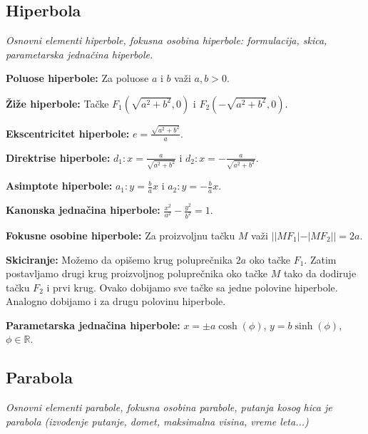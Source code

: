 \documentclass[12pt]{article}
\begin{document}
\subsection{Hiperbola}
\textit{Osnovni elementi hiperbole, fokusna osobina hiperbole: formulacija,
    skica, parametarska jednačina hiperbole.}
\par
\vspace*{1cm}

\textbf{Poluose hiperbole:} Za poluose $a$ i $b$ važi $a,b>0$.
\par

\textbf{Žiže hiperbole:} Tačke $F_1(\sqrt{a^2+b^2},0)$ i $F_2(-\sqrt{a^2+b^2},0)$.
\par

\textbf{Ekscentricitet hiperbole:} $e=\frac{\sqrt{a^2+b^2}}{a}$.
\par

\textbf{Direktrise hiperbole:} $d_1: x=\frac{a}{\sqrt{a^2+b^2}}$ i
$d_2: x=-\frac{a}{\sqrt{a^2+b^2}}$.
\par

\textbf{Asimptote hiperbole:} $a_1: y=\frac{b}{a}x$ i
$a_2: y=-\frac{b}{a}x$.
\par

\textbf{Kanonska jednačina hiperbole:} $\frac{x^2}{a^2}-\frac{y^2}{b^2}=1$.
\par

\textbf{Fokusne osobine hiperbole:} Za proizvoljnu tačku $M$ važi
$||MF_1|-|MF_2||=2a$.
\par

\textbf{Skiciranje:} Možemo da opišemo krug poluprečnika $2a$ oko tačke $F_1$.
Zatim postavljamo drugi krug proizvoljnog poluprečnika oko tačke $M$ tako da
dodiruje tačku $F_2$ i prvi krug. Ovako dobijamo sve tačke sa jedne polovine
hiperbole. Analogno dobijamo i za drugu polovinu hiperbole.
\par

\textbf{Parametarska jednačina hiperbole:} $x=\pm a\cosh(\phi)$, $y=b\sinh(\phi)$,
$\phi\in\mathbb{R}$.

\subsection{Parabola}
\textit{Osnovni elementi parabole, fokusna osobina parabole, putanja kosog hica
    je parabola (izvođenje putanje, domet, maksimalna visina, vreme leta...)}
\par
\vspace*{1cm}
\end{document}
